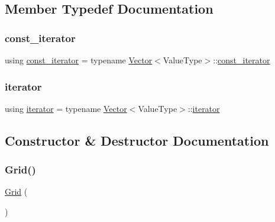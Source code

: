 \subsection{Member Typedef Documentation}
\mbox{\label{classGrid_a85b414fe7dab929481b0e9d4cbc8eaed}} 
\subsubsection{\texorpdfstring{const\+\_\+iterator}{const\_iterator}}
{\footnotesize\ttfamily using \mbox{\hyperlink{classGrid_a85b414fe7dab929481b0e9d4cbc8eaed}{const\+\_\+iterator}} =  typename \mbox{\hyperlink{classVector}{Vector}}$<$Value\+Type$>$\+::\mbox{\hyperlink{classGrid_a85b414fe7dab929481b0e9d4cbc8eaed}{const\+\_\+iterator}}}

\mbox{\label{classGrid_afc815b8f7acde11a959911c7f7222116}} 
\subsubsection{\texorpdfstring{iterator}{iterator}}
{\footnotesize\ttfamily using \mbox{\hyperlink{classGrid_afc815b8f7acde11a959911c7f7222116}{iterator}} =  typename \mbox{\hyperlink{classVector}{Vector}}$<$Value\+Type$>$\+::\mbox{\hyperlink{classGrid_afc815b8f7acde11a959911c7f7222116}{iterator}}}



\subsection{Constructor \& Destructor Documentation}
\mbox{\label{classGrid_ac9458fbc282411d7bbf8806fe5a0b863}} 
\subsubsection{\texorpdfstring{Grid()}{Grid()}\hspace{0.1cm}{\footnotesize\ttfamily [1/4]}}
{\footnotesize\ttfamily \mbox{\hyperlink{classGrid}{Grid}} (\begin{DoxyParamCaption}{ }\end{DoxyParamCaption})\hspace{0.3cm}{\ttfamily [default]}}

